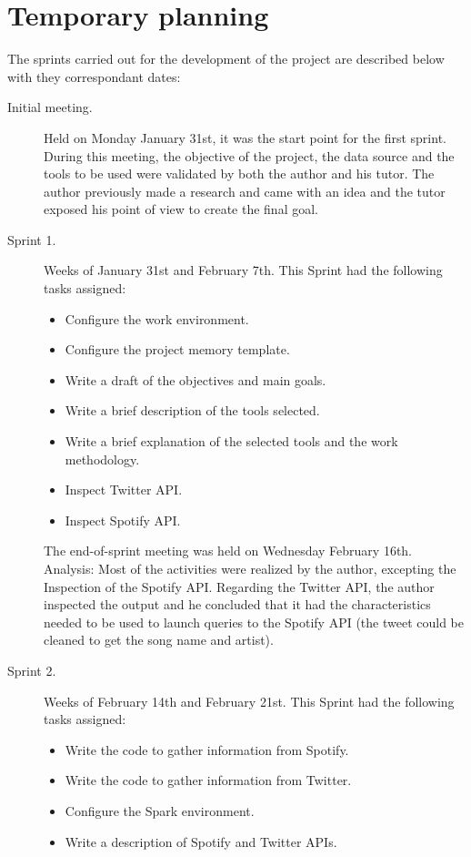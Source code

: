 \section{Temporary planning}
\nonzeroparskip The sprints carried out for the development of the project are described below with they correspondant dates:
\begin{description}
	\item[Initial meeting.] Held on Monday January 31st, it was the start point for the first sprint. During this meeting, the objective of the project, the data source and the tools to be used were validated by both the author and his tutor. The author previously made a research and came with an idea and the tutor exposed his point of view to create the final goal.
	\item[Sprint 1.] Weeks of January 31st and February 7th. This Sprint had the following tasks assigned:
	\begin{itemize}
		\item Configure the work environment.
		\item Configure the project memory template.
		\item Write a draft of the objectives and main goals.
		\item Write a brief description of the tools selected.
		\item Write a brief explanation of the selected tools and the work methodology.
		\item Inspect Twitter API.
		\item Inspect Spotify API.
	\end{itemize}
	The end-of-sprint meeting was held on Wednesday February 16th.
	Analysis: Most of the activities were realized by the author, excepting the Inspection of the Spotify API. Regarding the Twitter API, the author inspected the output and he concluded that it had the characteristics needed to be used to launch queries to the Spotify API (the tweet could be cleaned to get the song name and artist).
	\item[Sprint 2.] Weeks of February 14th and February 21st. This Sprint had the following tasks assigned:
	\begin{itemize}
		\item Write the code to gather information from Spotify.
		\item Write the code to gather information from Twitter.
		\item Configure the Spark environment.
		\item Write a description of Spotify and Twitter APIs.

\end{itemize}
\end{description}
